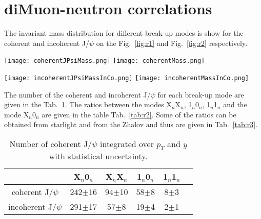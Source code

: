   \section{diMuon-neutron correlations}
    The invariant mass distribution for different break-up modes is show for the coherent and incoherent J/$\psi$ on the Fig.~\ref{fig:r1} and Fig.~\ref{fig:r2} respectively. 
    \begin{figure*}[!Hhtb]
      \begin{center}
        \texttt{[image: coherentJPsiMass.png]}
        \texttt{[image: coherentMass.png]}
        \caption{
          \label{fig:r1}  
          Invariant mass spectrum of the opposite signs di-muons originating from the coherent J/$\psi$ for $X_{n}0_{n}$ breakup mode for two invariant mass regions.  
        }
      \end{center}
    \end{figure*}
    
    \begin{figure*}[!Hhtb]
      \begin{center}
        \texttt{[image: incoherentJPsiMassInCo.png]}
        \texttt{[image: incoherentMassInCo.png]}
        \caption{
          Invariant mass spectrum of the opposite signs di-muons originating
          from the incoherent J/$\psi$  for $X_{n}0_{n}$ breakup mode for two 
          invariant mass regions.   
        }
        \label{fig:r2}  
      \end{center}
    \end{figure*}
    
    The number of the coherent and incoherent J/$\psi$ for each break-up mode are
      given in the Tab.~\ref{tab:r1}. 
    The ratios between the modes X$_{n}$X$_{n}$, 1$_{n}$0$_{n}$, 1$_{n}$1$_{n}$ and
      the mode  X$_{n}$0$_{n}$ are given in the table Tab.~\ref{tab:r2}. 
    Some of the  ratios can be obtained from  {\sc starlight} and from the Zhalov 
      and thus are given in Tab.~\ref{tab:r3}.
    
    \begin{table}[h]
    \begin{center}
    \caption{Number of coherent J/$\psi$ integrated over $p_{T}$ and $y$ with statistical uncertainty.}
    \label{tab:r1}
    \begin{tabular}{|c|c|c|c|c|c|}
    \hline
                                   &  X$_{n}$0$_{n}$& X$_{n}$X$_{n}$ & 1$_{n}$0$_{n}$ & 1$_{n}$1$_{n}$  \\ 
    \hline
    coherent J/$\psi$ &  242$\pm$16&94$\pm$10&58$\pm$8&8$\pm$3\\
    \hline
     incoherent J/$\psi$ & 291$\pm$17&57$\pm$8&19$\pm$4&2$\pm$1  \\
    \hline
    \end{tabular}
    \end{center}
    
    \end{table}
    
